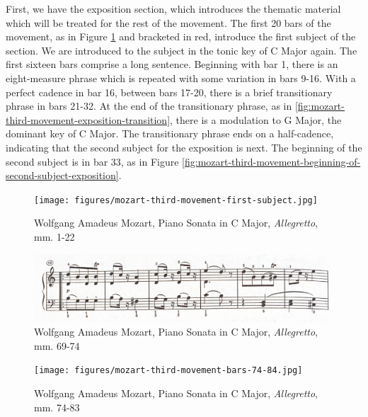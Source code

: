 First, we have the exposition section, which introduces the thematic material which will be treated for the rest of the movement. The first 20 bars of the movement, as in Figure \ref{fig:mozart-third-movement-first-subject}\autocite{Henle_1977} and bracketed in red, introduce the first subject of the section. We are introduced to the subject in the tonic key of C Major again. The first sixteen bars comprise a long sentence. Beginning with bar 1, there is an eight-measure phrase which is repeated with some variation in bars 9-16. With a perfect cadence in bar 16, between bars 17-20, there is a brief transitionary phrase in bars 21-32. At the end of the transitionary phrase, as in \ref{fig:mozart-third-movement-exposition-transition}\autocite{Henle_1977}, there is a modulation to G Major, the dominant key of C Major. The transitionary phrase ends on a half-cadence, indicating that the second subject for the exposition is next. The beginning of the second subject is in bar 33, as in Figure \ref{fig:mozart-third-movement-beginning-of-second-subject-exposition}\autocite{Henle_1977}. 

\begin{figure}
	\centering
	\texttt{[image: figures/mozart-third-movement-first-subject.jpg]}
	\caption{Wolfgang Amadeus Mozart, Piano Sonata in C Major, \textit{Allegretto}, mm. 1-22}
	\label{fig:mozart-third-movement-first-subject}
\end{figure}

\begin{figure}
	\centering
	\includegraphics[width=\textwidth]{figures/mozart-third-movement-development-section-first-six-bars.jpg}
	\caption{Wolfgang Amadeus Mozart, Piano Sonata in C Major, \textit{Allegretto}, mm. 69-74}
	\label{fig:mozart-third-movement-development-section-first-six-bars}
\end{figure}

\begin{figure}
	\centering
	\texttt{[image: figures/mozart-third-movement-bars-74-84.jpg]}
	\caption{Wolfgang Amadeus Mozart, Piano Sonata in C Major, \textit{Allegretto}, mm. 74-83}
	\label{fig:mozart-third-movement-bars-74-84}
\end{figure}

